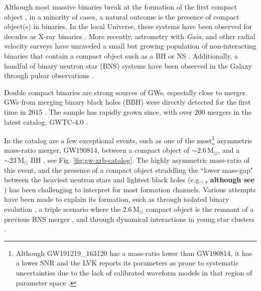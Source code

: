 \documentclass[linenumbers,trackchanges,twocolumn]{aastex701}
\newcommand{\Mdot}{\mathrm{M}_{\odot}}
\begin{document}
Although most massive binaries break at the formation of the first compact object \citep[e.g.,][]{2019A&A...624A..66R}, in a minority of cases, a natural outcome is the presence of compact object(s) in binaries. In the local Universe, these systems have been observed for decades as X-ray binaries \textbf{\citep{2023A&A...671A.149F}}. More recently, astrometry with \emph{Gaia}, and other radial velocity surveys have unraveled a small but growing population of non-interacting binaries that contain a compact object such as a BH \citep[e.g.,][]{2023MNRAS.518.1057E,2023MNRAS.521.4323E,2023AJ....166....6C,2024A&A...686L...2G, 2022NatAs...6.1085S} or NS \citep[e.g.,][]{2024OJAp....7E..58E}. Additionally, a handful of binary neutron star (BNS) systems have been observed in the Galaxy through pulsar observations \citep[e.g.,][]{2003Natur.426..531B, 2005AJ....129.1993M}.

Double compact binaries are strong sources of GWs, especially close to merger. GWs from merging binary black holes (BBH) were directly detected for the first time in 2015 \citep{2016PhRvL.116f1102A}. The sample has rapidly grown since, with over $200$ mergers in the latest catalog, GWTC-4.0 \citep{2025arXiv250818082T,2025arXiv250818083T}.

In the catalog are a few exceptional events, such as one of the most\footnote{Although GW191219\_163120 has a mass-ratio lower than GW190814, it has a lower SNR and the LVK reports its parameters as prone to systematic uncertainties due to the lack of calibrated waveform models in that region of parameter space \citep{2023PhRvX..13d1039A}.} asymmetric mass-ratio merger, GW190814, between a compact object of $\sim 2.6\,\Mdot$, and a $\sim 23\,\Mdot$ BH \citep{2020ApJ...896L..44A}, see Fig. \ref{fig:gw-xrb-catalog}. The highly asymmetric mass-ratio of this event, and the presence of a compact object straddling the ``lower mass-gap" between the heaviest neutron stars and lightest black holes (e.g., \textbf{\citealp{1998ApJ...499..367B, 2010ApJ...725.1918O, 2011ApJ...741..103F}, although see \citealp{2012ApJ...757...36K, 2020A&A...636A..20W, 2024ApJ...970L..34A}}) has been challenging to interpret for most formation channels. Various attempts have been made to explain its formation, such as through isolated binary evolution \citep[e.g.,][]{2020ApJ...899L...1Z, 2021MNRAS.500.1380M, 2025arXiv251116648M}, a triple scenario where the $2.6\,\Mdot$ compact object is the remnant of a previous BNS merger \citep{2021MNRAS.500.1817L}, and through dynamical interactions in young star clusters \citep[e.g.,][]{2021ApJ...908L..38A}.
\end{document}
